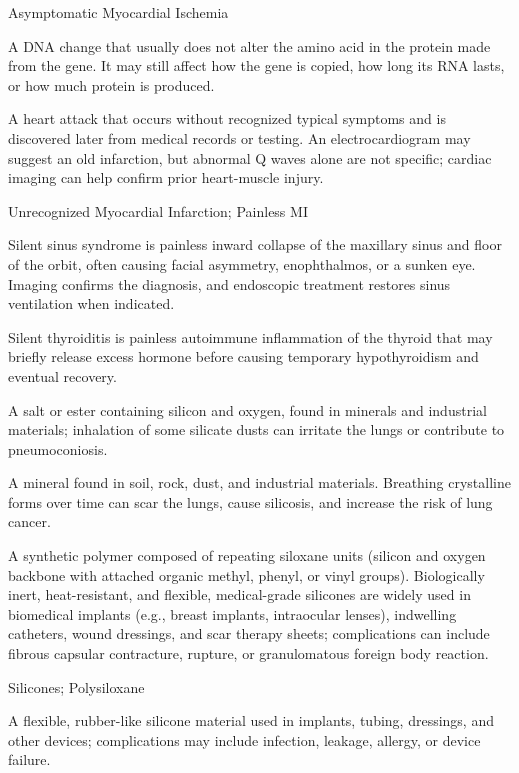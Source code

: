 \synonyms
Asymptomatic Myocardial Ischemia

 A DNA change that usually does not alter the amino acid in the protein made from the gene. It may still affect how the gene is copied, how long its RNA lasts, or how much protein is produced.

 A heart attack that occurs without recognized typical symptoms and is discovered later from medical records or testing. An electrocardiogram may suggest an old infarction, but abnormal Q waves alone are not specific; cardiac imaging can help confirm prior heart-muscle injury.

\synonyms
Unrecognized Myocardial Infarction; Painless MI

 Silent sinus syndrome is painless inward collapse of the maxillary sinus and floor of the orbit, often causing facial asymmetry, enophthalmos, or a sunken eye. Imaging confirms the diagnosis, and endoscopic treatment restores sinus ventilation when indicated.

 Silent thyroiditis is painless autoimmune inflammation of the thyroid that may briefly release excess hormone before causing temporary hypothyroidism and eventual recovery.

 A salt or ester containing silicon and oxygen, found in minerals and industrial materials; inhalation of some silicate dusts can irritate the lungs or contribute to pneumoconiosis.

 A mineral found in soil, rock, dust, and industrial materials. Breathing crystalline forms over time can scar the lungs, cause silicosis, and increase the risk of lung cancer.

 A synthetic polymer composed of repeating siloxane units (silicon and oxygen backbone with attached organic methyl, phenyl, or vinyl groups). Biologically inert, heat-resistant, and flexible, medical-grade silicones are widely used in biomedical implants (e.g., breast implants, intraocular lenses), indwelling catheters, wound dressings, and scar therapy sheets; complications can include fibrous capsular contracture, rupture, or granulomatous foreign body reaction.

\synonyms
Silicones; Polysiloxane

 A flexible, rubber-like silicone material used in implants, tubing, dressings, and other devices; complications may include infection, leakage, allergy, or device failure.

